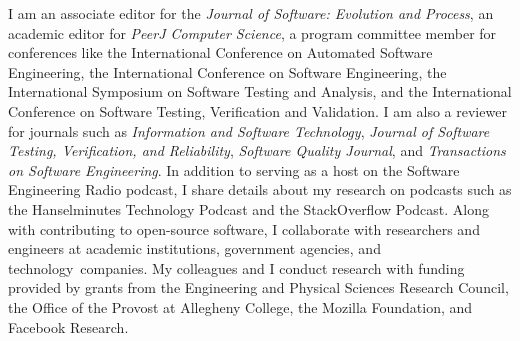 \documentclass[11pt,letterpaper,sans]{moderncv}
\begin{document}
{\small
  I am an associate editor for the {\em Journal of Software: Evolution and Process},
  an academic editor for {\em PeerJ Computer Science}, a program
  committee member for conferences like the International Conference on
  Automated Software Engineering, the International Conference on Software
  Engineering, the International Symposium on Software Testing and Analysis, and
  the International Conference on Software Testing, Verification and Validation.
  I am also a reviewer for journals such as {\em Information and Software
  Technology}, {\em Journal of Software Testing, Verification, and Reliability},
  {\em Software Quality Journal}, and {\em Transactions on Software
  Engineering}. In addition to serving as a host on the Software Engineering
  Radio podcast, I share details about my research on podcasts such as the
  Hanselminutes Technology Podcast and the StackOverflow Podcast. Along with
  contributing to open-source software, I collaborate with researchers and
  engineers at academic institutions, government agencies, and
  \mbox{technology companies}. My colleagues and I conduct research with funding
  provided by grants from the Engineering and Physical Sciences Research
  Council, the Office of the Provost at Allegheny College, the Mozilla
  Foundation, and Facebook Research.
}

%


%
\nocite{*}

%
\setlength\bibitemsep{-.15in}

%
\renewcommand*{\bibfont}{\small}

%

%
\printbibliography[filter=papers,title={Research Publications}]

%
\end{document}
